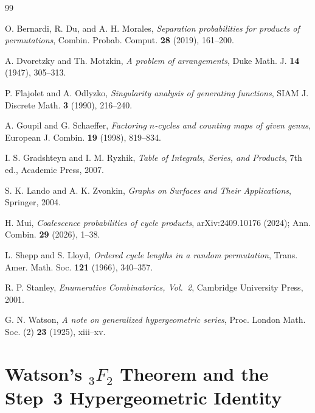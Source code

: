 \documentclass[12pt,a4paper]{article}
\theoremstyle{definition}
\begin{document}
\begin{thebibliography}{99}

O. Bernardi, R. Du, and A. H. Morales,
\textit{Separation probabilities for products of permutations},
Combin. Probab. Comput. \textbf{28} (2019), 161--200.

A. Dvoretzky and Th. Motzkin,
\textit{A problem of arrangements},
Duke Math. J. \textbf{14} (1947), 305--313.

P. Flajolet and A. Odlyzko,
\textit{Singularity analysis of generating functions},
SIAM J. Discrete Math. \textbf{3} (1990), 216--240.

A. Goupil and G. Schaeffer,
\textit{Factoring $n$-cycles and counting maps of given genus},
European J. Combin. \textbf{19} (1998), 819--834.

I. S. Gradshteyn and I. M. Ryzhik,
\textit{Table of Integrals, Series, and Products}, 7th ed.,
Academic Press, 2007.

S. K. Lando and A. K. Zvonkin,
\textit{Graphs on Surfaces and Their Applications},
Springer, 2004.

H. Mui,
\textit{Coalescence probabilities of cycle products},
arXiv:2409.10176 (2024);
Ann. Combin. \textbf{29} (2026), 1--38.

L. Shepp and S. Lloyd,
\textit{Ordered cycle lengths in a random permutation},
Trans. Amer. Math. Soc. \textbf{121} (1966), 340--357.

R. P. Stanley,
\textit{Enumerative Combinatorics, Vol.~2},
Cambridge University Press, 2001.

G. N. Watson,
\textit{A note on generalized hypergeometric series},
Proc. London Math. Soc. (2) \textbf{23} (1925), xiii--xv.

\end{thebibliography}

\section{Watson's \texorpdfstring{${}_{3}F_2$}{3F2} Theorem and the Step~3 Hypergeometric Identity}
\label{app:watson}
\end{document}
